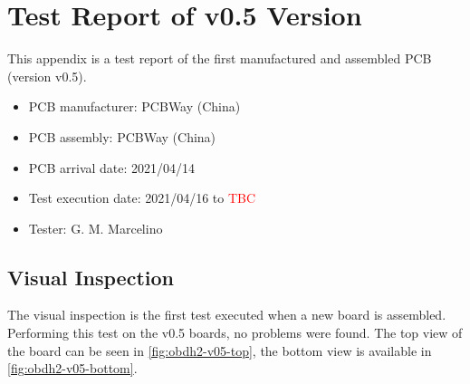 %
%
%
%
%

%
%
%
%
%
%

\chapter{Test Report of v0.5 Version} \label{anx:test-report-v05}

This appendix is a test report of the first manufactured and assembled PCB (version v0.5).

\begin{itemize}
    \item PCB manufacturer: PCBWay (China)
    \item PCB assembly: PCBWay (China)
    \item PCB arrival date: 2021/04/14
    \item Test execution date: 2021/04/16 to \textcolor{red}{TBC}
    \item Tester: G. M. Marcelino
\end{itemize}

\section{Visual Inspection}

The visual inspection is the first test executed when a new board is assembled. Performing this test on the v0.5 boards, no problems were found. The top view of the board can be seen in \autoref{fig:obdh2-v05-top}, the bottom view is available in \autoref{fig:obdh2-v05-bottom}.

